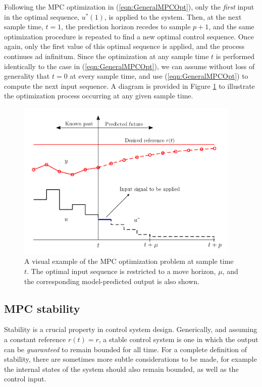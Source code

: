 Following the MPC optimization in (\ref{eqn:GeneralMPCOpt}), only the \emph{first} input in the optimal sequence, $u^*(1)$, is applied to the system. Then, at the next sample time, $t=1$, the prediction horizon recedes to sample $p+1$, and the same optimization procedure is repeated to find a new optimal control sequence. Once again, only the first value of this optimal sequence is applied, and the process continues ad infinitum. Since the optimization at any sample time $t$ is performed identically to the case in (\ref{eqn:GeneralMPCOpt}), we can assume without loss of generality that $t=0$ at every sample time, and use (\ref{eqn:GeneralMPCOpt}) to compute the next input sequence. A diagram is provided in Figure \ref{fig:MPCoverview} to illustrate the optimization process occurring at any given sample time.

\begin{figure}[h]
\centering
\includegraphics[width = 0.95\textwidth]{Chapter2_SysIDandControl/MPCoverview.pdf}
\caption{A visual example of the MPC optimization problem at sample time $t$. The optimal input sequence is restricted to a move horizon, $\mu$, and the corresponding model-predicted output is also shown.}
\label{fig:MPCoverview}
\end{figure}

\subsection{MPC stability}

Stability is a crucial property in control system design. Generically, and assuming a constant reference $r(t) = r$, a stable control system is one in which the output can be \emph{guaranteed} to remain bounded for all time. For a complete definition of stability, there are sometimes more subtle considerations to be made, for example the internal states of the system should also remain bounded, as well as the control input.

